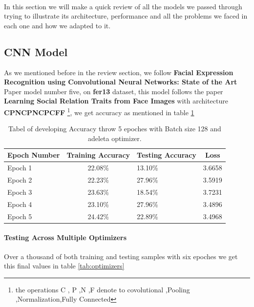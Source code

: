 \paragraph{}
In this section we will make a quick review of all the models we passed through trying to illustrate its architecture, performance and all the problems we faced in each one and how we adapted to it.
\subsection{CNN Model}
As we mentioned before in the review section, we follow \textbf{Facial Expression Recognition using Convolutional Neural Networks: State of the Art} Paper\cite{state_of_art} model number five,
on \textbf{fer13} dataset, this model follows the paper \textbf{Learning Social Relation Traits from Face Images} with architecture \textbf{CPNCPNCPCFF} \footnote{ the operations C , P ,N ,F denote to covolutional ,Pooling ,Normalization,Fully Connected }, we get accuracy as mentioned in table \ref{tab:14model}
\begin{table}[h!]
	\begin{center}
		\caption{Tabel of developing Accuracy throw  5 epoches with Batch size 128 and adeleta optimizer.}
		\label{tab:14model}
		\begin{tabular}{l|c|l|c}
			\textbf{Epoch Number} & \textbf{Training Accuracy} & \textbf{Testing Accuracy} &\textbf{Loss}\\ 
			\hline 
			Epoch 1 & 22.08\% & 13.10\% & 3.6658 \\
			Epoch 2 & 22.23\% & 27.96\% & 3.5919 \\
			Epoch 3 & 23.63\% & 18.54\% & 3.7231 \\
			Epoch 4 & 23.10\% & 27.96\% & 3.4896 \\
			Epoch 5 & 24.42\% & 22.89\% &  3.4968 \\									
			\end{tabular}
	\end{center}

\end{table}
\paragraph{Testing Across Multiple Optimizers}
Over a thousand of both training and testing samples with six epoches we get this final values in table \ref{tab:optimizers}

